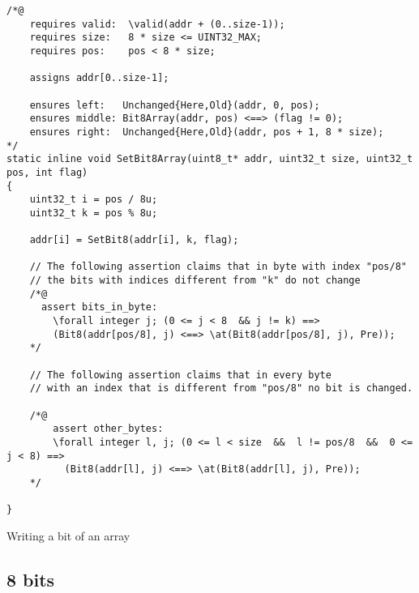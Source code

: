 \begin{listing}[hbt]
\begin{minipage}{0.99\textwidth}
\begin{lstlisting}[style=acsl-block]
/*@
    requires valid:  \valid(addr + (0..size-1));
    requires size:   8 * size <= UINT32_MAX;
    requires pos:    pos < 8 * size;

    assigns addr[0..size-1];

    ensures left:   Unchanged{Here,Old}(addr, 0, pos);
    ensures middle: Bit8Array(addr, pos) <==> (flag != 0);
    ensures right:  Unchanged{Here,Old}(addr, pos + 1, 8 * size);
*/
static inline void SetBit8Array(uint8_t* addr, uint32_t size, uint32_t pos, int flag)
{
    uint32_t i = pos / 8u;
    uint32_t k = pos % 8u;

    addr[i] = SetBit8(addr[i], k, flag);

    // The following assertion claims that in byte with index "pos/8"
    // the bits with indices different from "k" do not change
    /*@
      assert bits_in_byte:
        \forall integer j; (0 <= j < 8  && j != k) ==>
        (Bit8(addr[pos/8], j) <==> \at(Bit8(addr[pos/8], j), Pre));
    */

    // The following assertion claims that in every byte
    // with an index that is different from "pos/8" no bit is changed.

    /*@
        assert other_bytes:
        \forall integer l, j; (0 <= l < size  &&  l != pos/8  &&  0 <= j < 8) ==>
          (Bit8(addr[l], j) <==> \at(Bit8(addr[l], j), Pre));
    */

}
\end{lstlisting}
\end{minipage}
\caption{\label{lst:SetBit8Array}Writing a bit of an  array}
\end{listing}








\FloatBarrier

\subsection{8 bits}
\label{subsec:low-level 8}









